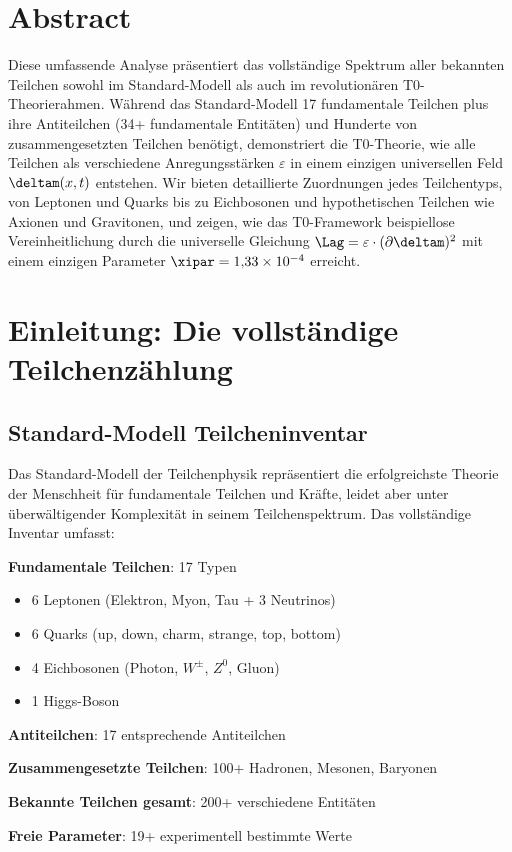 \section*{Abstract}
		Diese umfassende Analyse präsentiert das vollständige Spektrum aller bekannten Teilchen sowohl im Standard-Modell als auch im revolutionären T0-Theorierahmen. Während das Standard-Modell 17 fundamentale Teilchen plus ihre Antiteilchen (34+ fundamentale Entitäten) und Hunderte von zusammengesetzten Teilchen benötigt, demonstriert die T0-Theorie, wie alle Teilchen als verschiedene Anregungsstärken $\varepsilon$ in einem einzigen universellen Feld $\deltam(x,t)$ entstehen. Wir bieten detaillierte Zuordnungen jedes Teilchentyps, von Leptonen und Quarks bis zu Eichbosonen und hypothetischen Teilchen wie Axionen und Gravitonen, und zeigen, wie das T0-Framework beispiellose Vereinheitlichung durch die universelle Gleichung $\Lag = \varepsilon \cdot (\partial \deltam)^2$ mit einem einzigen Parameter $\xipar = 1{,}33 \times 10^{-4}$ erreicht.

	
	
	\section{Einleitung: Die vollständige Teilchenzählung}
	
	\subsection{Standard-Modell Teilcheninventar}
	
	Das Standard-Modell der Teilchenphysik repräsentiert die erfolgreichste Theorie der Menschheit für fundamentale Teilchen und Kräfte, leidet aber unter überwältigender Komplexität in seinem Teilchenspektrum. Das vollständige Inventar umfasst:
	
	\begin{tcolorbox}[colback=red!5!white,colframe=red!75!black,title=Standard-Modell Komplexitätskrise]
		\textbf{Fundamentale Teilchen}: 17 Typen
		\begin{itemize}
			\item 6 Leptonen (Elektron, Myon, Tau + 3 Neutrinos)
			\item 6 Quarks (up, down, charm, strange, top, bottom)
			\item 4 Eichbosonen (Photon, $W^{\pm}$, $Z^0$, Gluon)
			\item 1 Higgs-Boson
		\end{itemize}
		
		\textbf{Antiteilchen}: 17 entsprechende Antiteilchen
		
		\textbf{Zusammengesetzte Teilchen}: 100+ Hadronen, Mesonen, Baryonen
		
		\textbf{Bekannte Teilchen gesamt}: 200+ verschiedene Entitäten
		
		\textbf{Freie Parameter}: 19+ experimentell bestimmte Werte
	\end{tcolorbox}
	
